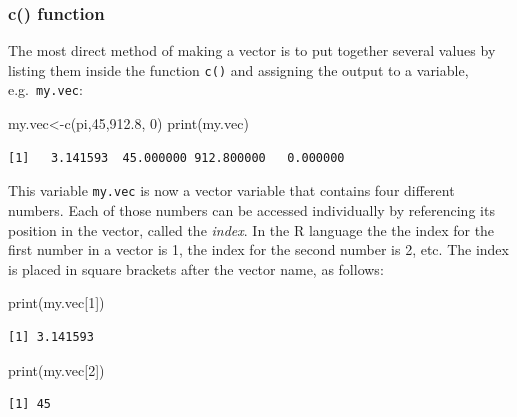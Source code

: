 \documentclass[
  letterpaper,
  DIV=11,
  numbers=noendperiod]{scrreprt}
\newenvironment{Shaded}{\begin{snugshade}}{\end{snugshade}}
\newcommand{\DecValTok}[1]{\textcolor[rgb]{0.68,0.00,0.00}{#1}}
\newcommand{\FloatTok}[1]{\textcolor[rgb]{0.68,0.00,0.00}{#1}}
\newcommand{\FunctionTok}[1]{\textcolor[rgb]{0.28,0.35,0.67}{#1}}
\newcommand{\NormalTok}[1]{\textcolor[rgb]{0.00,0.23,0.31}{#1}}
\newcommand{\OtherTok}[1]{\textcolor[rgb]{0.00,0.23,0.31}{#1}}
\begin{document}
\hypertarget{c-function}{%
\subsubsection{c() function}\label{c-function}}

The most direct method of making a vector is to put together several
values by listing them inside the function \texttt{c()} and assigning
the output to a variable, e.g.~\texttt{my.vec}:

\begin{Shaded}
\begin{Highlighting}[]
\NormalTok{my.vec}\OtherTok{\textless{}{-}}\FunctionTok{c}\NormalTok{(pi,}\DecValTok{45}\NormalTok{,}\FloatTok{912.8}\NormalTok{, }\DecValTok{0}\NormalTok{)}
\FunctionTok{print}\NormalTok{(my.vec)}
\end{Highlighting}
\end{Shaded}

\begin{verbatim}
[1]   3.141593  45.000000 912.800000   0.000000
\end{verbatim}

This variable \texttt{my.vec} is now a vector variable that contains
four different numbers. Each of those numbers can be accessed
individually by referencing its position in the vector, called the
 \emph{index}. In the R language
the the index for the first number in a vector is 1, the index for the
second number is 2, etc. The index is placed in square brackets after
the vector name, as follows:

\begin{Shaded}
\begin{Highlighting}[]
\FunctionTok{print}\NormalTok{(my.vec[}\DecValTok{1}\NormalTok{])}
\end{Highlighting}
\end{Shaded}

\begin{verbatim}
[1] 3.141593
\end{verbatim}

\begin{Shaded}
\begin{Highlighting}[]
\FunctionTok{print}\NormalTok{(my.vec[}\DecValTok{2}\NormalTok{])}
\end{Highlighting}
\end{Shaded}

\begin{verbatim}
[1] 45
\end{verbatim}
\end{document}
